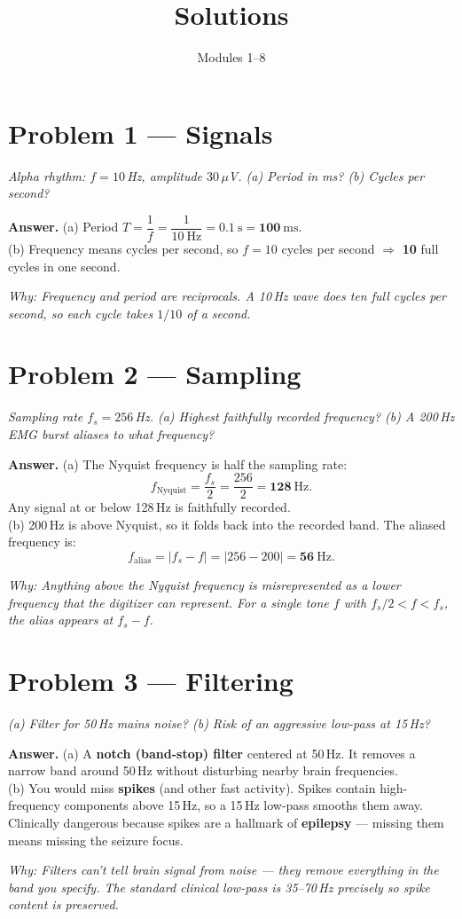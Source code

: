 \documentclass[11pt,letterpaper]{article}
\title{\color{accent}Solutions}
\author{}
\date{Modules 1--8}
\newcommand{\answer}[1]{%
\begin{tcolorbox}[colback=ansbg,colframe=accent!60,boxrule=0.4pt,arc=3pt,
  left=8pt,right=8pt,top=5pt,bottom=5pt]
\textbf{Answer.} #1
\end{tcolorbox}}
\newcommand{\why}[1]{\par\vspace{0.2em}\textit{Why: #1}}
\begin{document}
\maketitle
\thispagestyle{empty}

\section*{Problem 1 — Signals}
\textit{Alpha rhythm: $f = 10$\,Hz, amplitude $30\,\mu$V. (a) Period in ms? (b) Cycles per second?}

\answer{(a) Period $T = \dfrac{1}{f} = \dfrac{1}{10\ \mathrm{Hz}} = 0.1\ \mathrm{s} = \mathbf{100\ \mathrm{ms}}$.
\\(b) Frequency means cycles per second, so $f = 10$ cycles per second $\Rightarrow$ \textbf{10} full cycles in one second.}
\why{Frequency and period are reciprocals. A 10\,Hz wave does ten full cycles per second, so each cycle takes $1/10$ of a second.}

\section*{Problem 2 — Sampling}
\textit{Sampling rate $f_s = 256$\,Hz. (a) Highest faithfully recorded frequency? (b) A 200\,Hz EMG burst aliases to what frequency?}

\answer{(a) The Nyquist frequency is half the sampling rate:
$$f_{\mathrm{Nyquist}} = \frac{f_s}{2} = \frac{256}{2} = \mathbf{128\ \mathrm{Hz}}.$$
Any signal at or below 128\,Hz is faithfully recorded.
\\(b) 200\,Hz is above Nyquist, so it folds back into the recorded band. The aliased frequency is:
$$f_{\mathrm{alias}} = |f_s - f| = |256 - 200| = \mathbf{56\ \mathrm{Hz}}.$$}
\why{Anything above the Nyquist frequency is misrepresented as a lower frequency that the digitizer \emph{can} represent. For a single tone $f$ with $f_s/2 < f < f_s$, the alias appears at $f_s - f$.}

\section*{Problem 3 — Filtering}
\textit{(a) Filter for 50\,Hz mains noise? (b) Risk of an aggressive low-pass at 15\,Hz?}

\answer{(a) A \textbf{notch (band-stop) filter} centered at 50\,Hz. It removes a narrow band around 50\,Hz without disturbing nearby brain frequencies.
\\(b) You would miss \textbf{spikes} (and other fast activity). Spikes contain high-frequency components above 15\,Hz, so a 15\,Hz low-pass smooths them away. Clinically dangerous because spikes are a hallmark of \textbf{epilepsy} --- missing them means missing the seizure focus.}
\why{Filters can't tell brain signal from noise --- they remove everything in the band you specify. The standard clinical low-pass is 35--70\,Hz precisely so spike content is preserved.}
\end{document}

